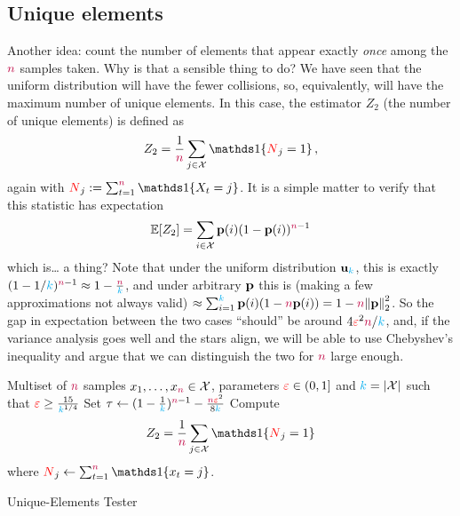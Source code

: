\subsection{Unique elements}
  \label{sec:uniformity:unique}
Another idea: count the number of elements that appear exactly \emph{once} among the ${\textcolor{purple}{n}}$ samples taken. Why is that a sensible thing to do? We have seen that the uniform distribution will have the fewer collisions, so, equivalently, will have the maximum number of unique elements. In this case, the estimator $Z_2$ (the number of unique elements) is defined as
\begin{equation}
  \label{eq:def:z2}
    Z_2 = \frac{1}{\ns} \sum_{j\in\domain} \indic{\occur_j=1}\,,
\end{equation}
again with $\occur_j \eqdef \sum_{t=1}^\ns \indic{X_t=j}$. It is a simple matter to verify that this statistic has expectation
\begin{equation}
  \label{eq:z2:expectation}
  \expect{Z_2} = \sum_{i\in\domain} \p(i)(1-\p(i))^{\ns-1}
\end{equation}
which is\dots{} a thing? Note that under the uniform distribution $\mathbf{u}_{\textcolor{cyan}{k}}$, this is exactly $(1-1/{\textcolor{cyan}{k}})^{{\textcolor{purple}{n}}-1}\approx 1 - \frac{{\textcolor{purple}{n}}}{{\textcolor{cyan}{k}}}$, and under arbitrary $\mathbf{p}$ this is (making a few approximations not always valid) $\approx \sum_{i=1}^\ab \p(i)(1-\ns\p(i)) = 1 - \ns\normtwo{\p}^2$. So the gap in expectation between the two cases ``should'' be around $4\textcolor{red}{\varepsilon}^2{\textcolor{purple}{n}}/{\textcolor{cyan}{k}}$, and, if the variance analysis goes well and the stars align, we will be able to use Chebyshev's inequality and argue that we can distinguish the two for ${\textcolor{purple}{n}}$ large enough.

\begin{algorithm}[ht!]
  \begin{algorithmic}[1]
    \Require Multiset of ${\textcolor{purple}{n}}$ samples $x_1,\dots,x_{\textcolor{purple}{n}} \in \mathcal{X}$, parameters $\textcolor{red}{\varepsilon}\in(0,1]$ and $\ab = \abs{\domain}$ such that $\textcolor{red}{\varepsilon} \geq \frac{15}{{\textcolor{cyan}{k}}^{1/4}}$
    \State Set $\tau \gets (1-\frac{1}{{\textcolor{cyan}{k}}})^{{\textcolor{purple}{n}}-1}-\frac{{\textcolor{purple}{n}}\textcolor{red}{\varepsilon}^2}{8{\textcolor{cyan}{k}}}$ 
    \State Compute 
    \[
        Z_2 = \frac{1}{\ns} \sum_{j\in\domain} \indic{\occur_j=1}
    \] where $\occur_j \gets \sum_{t=1}^\ns\indic{x_t=j}$.
     \Return \reject {}
    \Else\ 
      \Return \accept {}
    \EndIf
  \end{algorithmic}
  \caption{\label{algo:unique-elements}\sc Unique-Elements Tester}
\end{algorithm}

